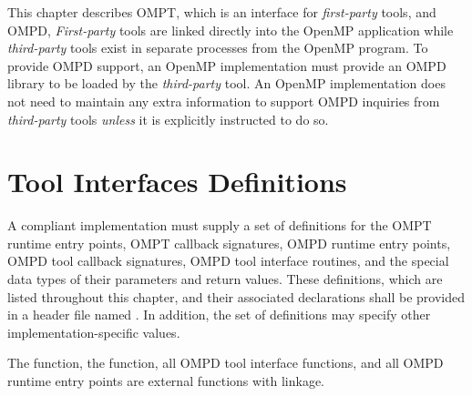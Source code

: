 This chapter describes OMPT, which is an interface for \emph{first-party} tools,
and OMPD, \emph{First-party} tools are linked directly into the OpenMP application
while \emph{third-party} tools exist in separate processes from the OpenMP program.
To provide OMPD support, an OpenMP implementation must provide an OMPD library to 
be loaded by the \emph{third-party} tool. An OpenMP implementation does not need 
to maintain any extra information to support OMPD inquiries from \emph{third-party} 
tools \emph{unless} it is explicitly instructed to do so.

\section{Tool Interfaces Definitions}
\label{sec:tool_interfaces_definitions}

\begin{ccppspecific}
A compliant implementation must supply a set of definitions for the OMPT runtime 
entry points, OMPT callback signatures, OMPD runtime entry points, OMPD tool 
callback signatures, OMPD tool interface routines, and the special data types of 
their parameters and return values. These definitions, which are listed throughout
this chapter, and their associated declarations shall be provided in a header file 
named . In addition, the set of definitions may specify other 
implementation-specific values.

The  function, the  function, 
all OMPD tool interface functions, and all OMPD runtime entry points are 
external functions with  linkage.
\end{ccppspecific}






